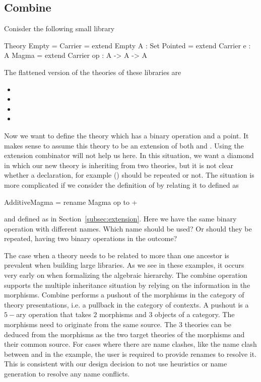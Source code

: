 \subsection{Combine}
\label{subsec:combine}
Conisder the following small library
\begin{togcode} 
Theory Empty = {} 
Carrier = extend Empty {A : Set}
Pointed = extend Carrier {e : A}
Magma   = extend Carrier {op : A -> A -> A}
\end{togcode} 
The flattened version of the theories of these libraries are 
\begin{itemize}
\item[] 
\item[] 
\item[]  
\item[]  
\end{itemize}
Now we want to define the theory  which has a binary operation and a point. It makes sense to assume this theory to be an extension of both  and . Using the extension combinator will not help us here. In this situation, we want a diamond in which our new theory is inheriting from two theories, but it is not clear whether a declaration, for example () should be repeated or not. 
The situation is more complicated if we consider the definition of  by relating it to  defined as 
\begin{togcode} 
AdditiveMagma = rename Magma {op to +} 
\end{togcode} 
\noindent and  defined as in Section~\ref{subsec:extension}. Here we have the same binary operation with different names. Which name should be used? Or should they be repeated, having two  binary operations in the outcome? 

The case when a theory needs to be related to more than one ancestor is prevalent when building large libraries. As we see in these examples, it occurs very early on when formalizing the algebraic hierarchy. The combine operation supports the multiple inheritance situation by relying on the information in the morphisms. Combine performs a pushout of the morphisms in the category of theory presentations, i.e. a pullback in the category of contexts.  A pushout is a $5-$ary operation that takes $2$ morphisms and $3$ objects of a category. The morphisms need to originate from the same source. The $3$ theories can be deduced from the morphisms as the two target theories of the morphisms and their common source. For cases where there are name clashes, like the name clash between  and \lstmath{+} in the  example, the user is required to provide renames to resolve it. This is consistent with our design decision to not use heuristics or name generation to resolve any name conflicts. 

